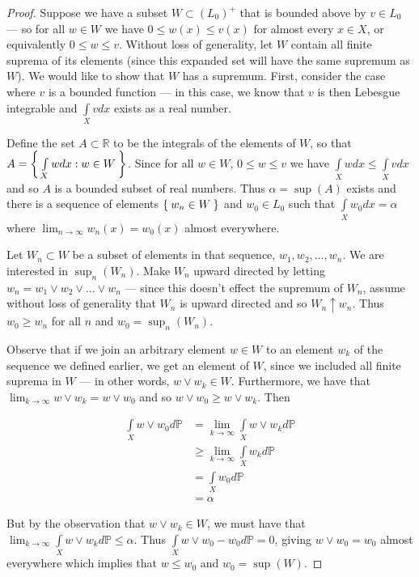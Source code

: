 \documentclass[letterpaper,10pt,oneside,onecolumn,reqno]{amsart}
\renewcommand{\P}{\mathbb P}
\newcommand{\R}{\mathbb R}
\theoremstyle{definition}
\newcommand{\join}{\vee}
\begin{document}
\begin{proof}
  Suppose we have a subset $W \subset (L_0)^+$ that is bounded above
  by $v \in L_0$ --- so for all $w \in W$ we have $0 \leq w(x) \leq
  v(x)$ for almost every $x \in X$, or equivalently $0 \leq w \leq
  v$. Without loss of generality, let $W$ contain all finite suprema
  of its elements (since this expanded set will have the same supremum
  as $W$). We would like to show that $W$ has a supremum. First,
  consider the case where $v$ is a bounded function --- in this case,
  we know that $v$ is then Lebesgue integrable and $\int\limits_X vdx$
  exists as a real number.

  Define the set $A \subset \R$ to be the integrals of the elements of
  $W$, so that $A = \Set{\int\limits_X w dx : w \in W}$. Since for all
  $w \in W$, $0 \leq w \leq v$ we have $\int\limits_X w dx \leq
  \int\limits_X v dx$ and so $A$ is a bounded subset of real
  numbers. Thus $\alpha = \sup(A)$ exists and there is a sequence of
  elements $\Set{w_n \in W}$ and $w_0 \in L_0$ such that
  $\int\limits_X w_0 dx = \alpha$ where $\lim_{n \to \infty}
  w_n(x)=w_{0}(x)$ almost everywhere.

  Let $W_n \subset W$ be a subset of elements in that sequence,
  $w_1,w_2,\dots,w_n$. We are interested in $\sup_n(W_n)$. Make $W_n$
  upward directed by letting $w_n = w_1 \join w_2 \join \dots \join
  w_n$ --- since this doesn't effect the supremum of $W_n$, assume
  without loss of generality that $W_n$ is upward directed and so $W_n
  \uparrow w_n$. Thus $w_0 \geq w_n$ for all $n$ and $w_0 =
  \sup_n(W_n)$.

  Observe that if we join an arbitrary element $w \in W$ to an element
  $w_k$ of the sequence we defined earlier, we get an element of $W$,
  since we included all finite suprema in $W$ --- in other words, $w
  \join w_k \in W$. Furthermore, we have that $\lim_{k \to \infty} w
  \join w_k = w \join w_0$ and so $w \join w_0 \geq w \join w_k$. Then

\begin{align*}
  \int\limits_X w \join w_0 d\P &= \lim_{k \to \infty}\int\limits_X w
  \join w_k d\P\\
  &\geq \lim_{k \to \infty} \int\limits_{X} w_k d\P\\
  &= \int\limits_X w_0 d\P\\
  &= \alpha
\end{align*}

But by the observation that $w \join w_k \in W$, we must have that
$\lim_{k \to \infty}\int\limits_X w \join w_k d\P \leq \alpha$. Thus
$\int\limits_X w \join w_0 - w_0 d\P = 0$, giving $w \join w_0 = w_0$
almost everywhere which implies that $w \leq w_0$ and $w_0 = \sup(W)$.


\end{proof}
\end{document}
